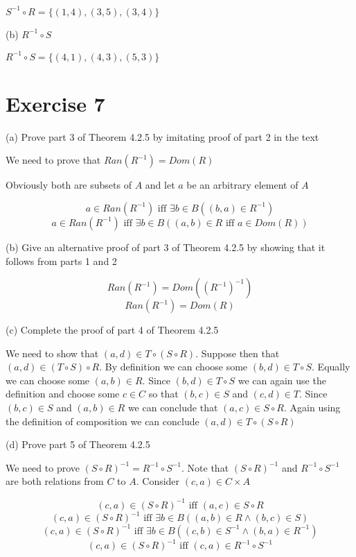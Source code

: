 \documentclass[11pt]{article}
\begin{document}
$S^{-1} \circ R = \{(1,4),(3,5),(3,4)\}$

\noindent (b) $R^{-1} \circ S$

$R^{-1} \circ S = \{(4,1),(4,3),(5,3)\}$


\section*{Exercise 7}

\noindent (a) Prove part 3 of Theorem 4.2.5 by imitating proof of part 2 in the text

We need to prove that $Ran(R^{-1}) = Dom(R)$

Obviously both are subsets of $A$ and let $a$ be an arbitrary element of $A$

$$a \in Ran(R^{-1}) \text{ iff } \exists b \in B ((b, a) \in R^{-1})$$
$$a \in Ran(R^{-1}) \text{ iff } \exists b \in B ((a, b) \in R \text{ iff } a \in Dom(R))$$

\noindent (b) Give an alternative proof of part 3 of Theorem 4.2.5 by showing that 
it follows from parts 1 and 2 

$$Ran(R^{-1}) = Dom((R^{-1})^{-1})$$
$$Ran(R^{-1}) = Dom(R)$$

\noindent (c) Complete the proof of part 4 of Theorem 4.2.5 

We need to show that $(a,d) \in T \circ (S \circ R)$. Suppose then that 
$(a, d) \in (T \circ S) \circ R$. By definition we can choose some 
$(b, d) \in T \circ S$. Equally we can choose some $(a, b) \in R$. Since 
$(b, d) \in T \circ S$ we can again use the definition and choose some 
$c \in C$ so that $(b, c) \in S$ and $(c, d) \in T$. Since $(b, c) \in S$ and 
$(a,b) \in R$ we can conclude that $(a,c) \in S \circ R$. Again using the definition 
of composition we can conclude $(a, d) \in T \circ (S \circ R)$

\noindent (d) Prove part 5 of Theorem 4.2.5 

We need to prove $(S \circ R)^{-1} = R^{-1} \circ S^{-1}$. Note that 
$(S \circ R)^{-1}$ and $R^{-1} \circ S^{-1}$ are both relations from $C$ to $A$. 
Consider $(c, a) \in C \times A$

$$(c, a) \in (S \circ R)^{-1} \text{ iff } (a, c) \in S \circ R$$
$$(c, a) \in (S \circ R)^{-1} \text{ iff } \exists b \in B ((a, b) \in R \wedge (b, c) \in S)$$
$$(c, a) \in (S \circ R)^{-1} \text{ iff } \exists b \in B ((c,b) \in S^{-1} \wedge (b, a) \in R^{-1})$$
$$(c, a) \in (S \circ R)^{-1} \text{ iff } (c,a) \in R^{-1} \circ S^{-1}$$
\end{document}
